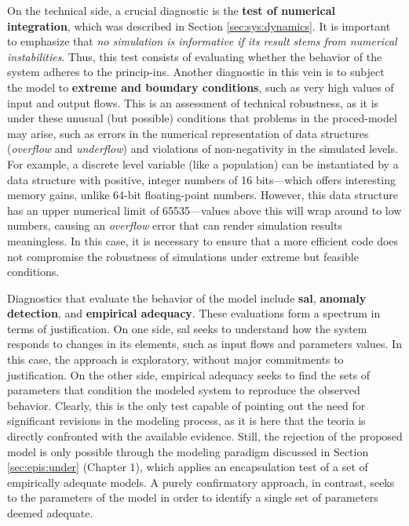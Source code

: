 \documentclass[./main_en.tex]{subfiles}
\begin{document}
\par On the technical side, a crucial diagnostic is the \textbf{test of numerical integration}, which was described in Section \ref{sec:sys:dynamics}. It is important to emphasize that \textit{no simulation is informative if its result stems from numerical instabilities}. Thus, this test consists of evaluating whether the behavior of the \gls{system} adheres to the \gls{princip-ins}. Another diagnostic in this vein is to subject the \gls{model} to \textbf{extreme and boundary conditions}, such as very high values of input and output flows. This is an assessment of technical robustness, as it is under these unusual (but possible) conditions that problems in the \gls{proced-model} may arise, such as errors in the numerical representation of data structures (\textit{overflow} and \textit{underflow}) and violations of non-negativity in the simulated levels. For example, a discrete level variable (like a population) can be instantiated by a data structure with positive, integer numbers of 16 bits—which offers interesting memory gains, unlike 64-bit floating-point numbers. However, this data structure has an upper numerical limit of 65535—values above this will wrap around to low numbers, causing an \textit{overflow} error that can render simulation results meaningless. In this case, it is necessary to ensure that a more efficient code does not compromise the robustness of simulations under extreme but feasible conditions.

\par Diagnostics that evaluate the behavior of the \gls{model} include \textbf{\gls{sal}}, \textbf{anomaly detection}, and \textbf{empirical adequacy}. These evaluations form a spectrum in terms of justification. On one side, \gls{sal} seeks to understand how the \gls{system} responds to changes in its elements, such as input flows and \gls{parameters} values. In this case, the approach is exploratory, without major commitments to justification. On the other side, empirical adequacy seeks to find the sets of \gls{parameters} that condition the modeled \gls{system} to reproduce the observed behavior. Clearly, this is the only test capable of pointing out the need for significant revisions in the modeling process, as it is here that the \gls{teoria} is directly confronted with the available evidence. Still, the rejection of the proposed \gls{model} is only possible through the modeling paradigm discussed in Section \ref{sec:epis:under} (Chapter 1), which applies an encapsulation test of a set of empirically adequate models. A purely confirmatory approach, in contrast, seeks to  the \gls{parameters} of the \gls{model} in order to identify a single set of \gls{parameters} deemed adequate.
\end{document}
